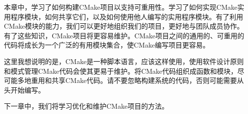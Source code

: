 本章中，学习了如何构建CMake项目以支持可重用性。学习了如何实现CMake实用程序模块，如何共享它们，以及如何使用他人编写的实用程序模块。有了利用CMake模块的能力，我们可以更好地组织我们的项目，更好地与团队成员协作。有了这些知识，CMake项目将更容易维护。CMake项目之间的通用的、可重用的代码将成长为一个广泛的有用模块集合，使CMake编写项目更容易。

这里我想说明的是，CMake是一种脚本语言，应该这样使用，使用软件设计原则和模式管理CMake代码会使其更易于维护。将CMake代码组织成函数和模块，尽可能多地重用和共享CMake代码。请不要忽略构建系统的代码，否则可能需要从头开始编写。

下一章中，我们将学习优化和维护CMake项目的方法。
